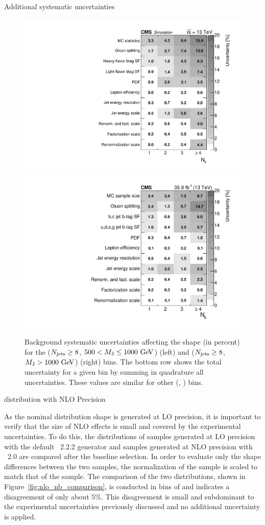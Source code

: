 \begin{section}{Additional systematic uncertainties}
\begin{figure}[tbp!]
\begin{center}
\includegraphics[angle=0,width=0.45\columnwidth]{fig/table_bkg_systs_bin20.pdf}
\includegraphics[angle=0,width=0.45\columnwidth]{fig/table_bkg_systs_bin21.pdf}
\end{center}
\caption{Background systematic uncertainties affecting the \Nb shape (in percent) for the ($N_{\mathrm{jets}} \geq 8$, $500 < M_{\mathrm{J}} \leq 1000~\mathrm{Ge\kern -0.1em V}$) (left) and ($N_{\mathrm{jets}} \geq 8$, $M_{\mathrm{J}} > 1000~\mathrm{Ge\kern -0.1em V}$) (right) bins.
The bottom row shows the total uncertainty for a given \Nb bin by summing in quadrature all uncertainties.
These values are similar for other (\Njets, \MJ) bins.}
\label{fig:bkg_sys_tables}
\end{figure}

\begin{subsection}{\Nb distribution with NLO Precision}

As the nominal \Nb distribution shape is generated at LO precision, it is important to verify that the size of NLO effects is small and covered by the experimental uncertainties.
To do this, the \Nb distributions of \ttbar samples generated at LO precision with the default \MGatNLO~2.2.2 generator and samples generated at NLO precision with \POWHEG~2.0 are compared after the baseline selection.
In order to evaluate only the shape differences between the two samples, the normalization of the \MGatNLO sample is scaled to match that of the \POWHEG sample.
The comparison of the two distributions, shown in Figure~\ref{fig:nlo_nb_comparison}, is conducted in bins of \Njets and indicates a disagreement of only about $5\%$.
This disagreement is small and subdominant to the experimental uncertainties previously discussed and no additional uncertainty is applied.


\end{subsection}
\end{section}
